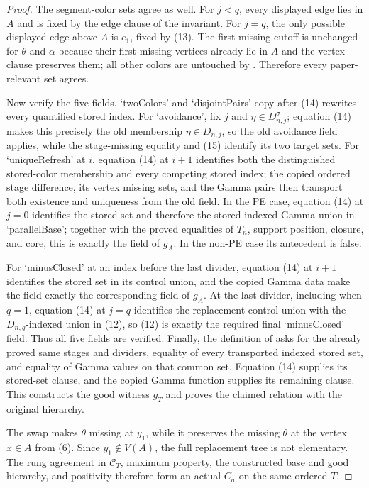 \begin{proof}
The segment-color sets agree as well.  For $j<q$, every displayed edge
lies in $A$ and is fixed by the edge clause of the invariant.  For
$j=q$, the only possible displayed edge above $A$ is $e_1$, fixed by
(13).  The first-missing cutoff is unchanged for $\theta$ and $\alpha$
because their first missing vertices already lie in $A$ and the vertex
clause preserves them; all other colors are untouched by
.  Therefore every paper-relevant
 set agrees.                   

Now verify the five  fields.  `twoColors' and
`disjointPairs' copy after (14) rewrites every quantified stored index.
For `avoidance', fix $j$ and
$\eta\in D^\sigma_{n,j}$; equation (14) makes this precisely the old
membership $\eta\in D_{n,j}$, so the old avoidance field applies, while
the stage-missing equality and (15) identify its two target sets.
For `uniqueRefresh' at $i$, equation (14) at $i+1$ identifies both the
distinguished stored-color membership and every competing stored index;
the copied ordered stage difference, its vertex missing sets, and the
Gamma pairs then transport both existence and uniqueness from the old
field.  In the PE case, equation (14) at $j=0$ identifies the stored set
and therefore the stored-indexed Gamma union in `parallelBase'; together
with the proved equalities of $T_n$, support position, closure, and core,
this is exactly the field of $g_A$.  In the non-PE case its antecedent is
false.

For `minusClosed' at an index before the last divider, equation (14) at
$i+1$ identifies the stored set in its control union, and the copied
Gamma data make the field exactly the corresponding field of $g_A$.
At the last divider, including when $q=1$, equation (14) at $j=q$
identifies the replacement control union with the $D_{n,q}$-indexed
union in (12), so (12) is exactly the required final `minusClosed'
field.  Thus all five fields are verified.  Finally, the definition of
 asks for the already proved same stages and
dividers, equality of every transported indexed stored set, and equality
of Gamma values on that common set.  Equation (14) supplies its stored-set
clause, and the copied Gamma function supplies its remaining clause.
This constructs the good witness $g_T$ and proves the claimed
 relation with the original hierarchy.

The swap makes $\theta$ missing at $y_1$, while it preserves the missing
$\theta$ at the vertex $x\in A$ from (6).  Since $y_1\notin V(A)$, the
full replacement tree is not elementary.  The rung agreement in
$\mathcal C_T$, maximum property, the constructed base and good
hierarchy, and positivity therefore form an actual
 $C_\sigma$ on the same ordered $T$.


\end{proof}
